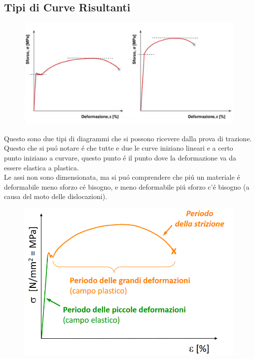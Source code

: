 \documentclass{article}
\begin{document}
        \subsection{Tipi di Curve Risultanti}
            \begin{figure}[!h]
                \centering
                \includegraphics[width=.85\linewidth]{Tipi di Curve da Prova di Trazione.png}
            \end{figure}
            Questo sono due tipi di diagrammi che si possono ricevere dalla prova di trazione. Questo che si pu\'o notare \'e che tutte e due le curve iniziano lineari e a certo punto iniziano a curvare, questo punto \'e il punto dove la deformazione va da essere elastica a plastica.\\
            Le assi non sono dimensionata, ma si pu\'o comprendere che pi\'u un materiale \'e deformabile meno sforzo c\'e bisogno, e meno deformabile pi\'u sforzo c'\'e bisogno (a causa del moto delle dislocazioni). 
            \begin{figure}[h!]
                \centering
                \includegraphics[width=.85\linewidth]{Diagramma sezionato di curva da prova di trazione.png}
            \end{figure}
\end{document}
